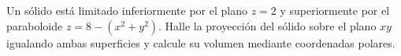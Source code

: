 \begin{prob}
Un sólido está limitado inferiormente por el plano $z=2$ y superiormente por
el paraboloide $z=8-(x^2+y^2)$. Halle la proyección del sólido sobre el
plano $xy$ igualando ambas superficies y calcule su volumen mediante
coordenadas polares.
\end{prob}


